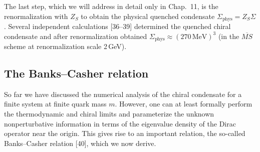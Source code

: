 The last step, which we will address in detail only in Chap.~11, is the
renormalization with $Z_S$ to obtain the physical quenched condensate
$\Sigma_{\mathrm{phys}} = Z_S \Sigma$. Several independent calculations
[36--39] determined the quenched chiral condensate and after renormalization
obtained $\Sigma_{\mathrm{phys}} \approx (270\,\mathrm{MeV})^3$ (in the
$\overline{MS}$ scheme at renormalization scale 2\,GeV).

\subsection{The Banks--Casher relation}

So far we have discussed the numerical analysis of the chiral condensate for a
finite system at finite quark mass $m$. However, one can at least formally
perform the thermodynamic and chiral limits and parameterize the unknown
nonperturbative information in terms of the eigenvalue density of the Dirac
operator near the origin. This gives rise to an important relation, the
so-called Banks--Casher relation [40], which we now derive.


